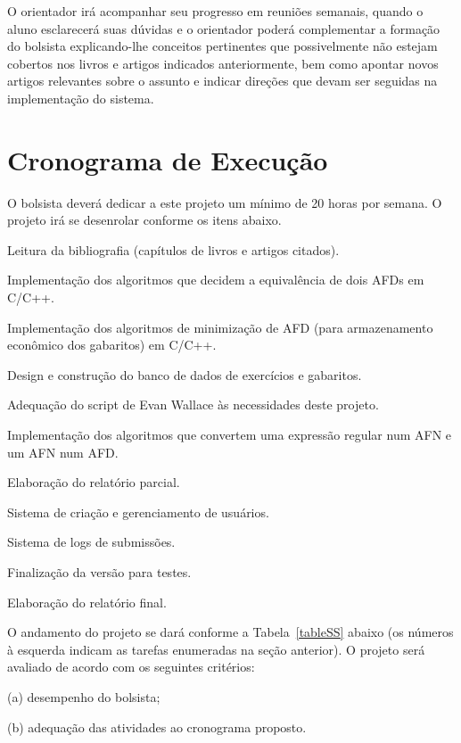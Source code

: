 \documentclass[
	12pt,				%
	openany,
	oneside,
	a4paper,			%
	english,			%
	brazil,				%
	]{abntex2}
\begin{document}
O orientador irá acompanhar seu progresso em reuniões semanais, quando o aluno esclarecerá suas dúvidas e o orientador poderá complementar a formação do bolsista explicando-lhe conceitos pertinentes que possivelmente não estejam cobertos nos livros e artigos indicados anteriormente, bem como apontar novos artigos relevantes sobre o assunto e indicar direções que devam ser seguidas na implementação do sistema.  



\chapter{Cronograma de Execução}

O bolsista deverá dedicar a este projeto um mínimo de 20 horas por semana. O projeto irá se desenrolar conforme os itens abaixo.  

\begin{alineas}
	\item Leitura da bibliografia (capítulos de livros e artigos citados).
	\item Implementação dos algoritmos que decidem a equivalência de dois AFDs em C/C++.
	\item Implementação dos algoritmos de minimização de AFD (para armazenamento econômico dos gabaritos) em C/C++.
	\item Design e construção do banco de dados de exercícios e gabaritos.
	\item Adequação do script de Evan Wallace às necessidades deste projeto.
	\item Implementação dos algoritmos que convertem uma expressão regular num AFN e um AFN num AFD.
	\item Elaboração do relatório parcial.
	\item Sistema de criação e gerenciamento de usuários.
	\item Sistema de logs de submissões.
	\item Finalização da versão para testes.
	\item Elaboração do relatório final.
\end{alineas}


\noindent O andamento do projeto se dará conforme a Tabela~\ref{tableSS} abaixo (os números à esquerda indicam as tarefas enumeradas na seção anterior). O projeto será avaliado de acordo com os seguintes critérios:

\begin{alineas}
	\item[(a)] desempenho do bolsista;
	\item[(b)] adequação das atividades ao cronograma proposto.
\end{alineas}
\end{document}

